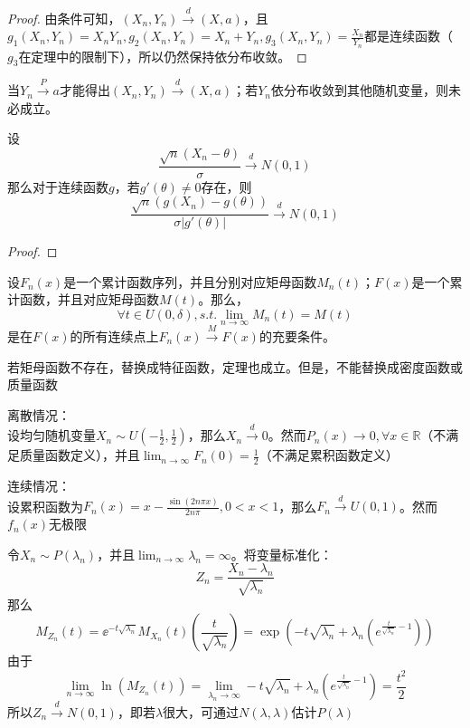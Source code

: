 \begin{proof}
    由条件可知，$(X_n,Y_n) \xrightarrow{d} (X,a)$，且$g_1(X_n,Y_n)=X_n Y_n, g_2(X_n,Y_n)=X_n+Y_n, g_3(X_n,Y_n)=\frac{X_n}{Y_n}$都是连续函数（$g_3$在定理中的限制下），所以仍然保持依分布收敛。
\end{proof}
\begin{remark}
    当$Y_n \xrightarrow{P} a$才能得出$(X_n,Y_n) \xrightarrow{d} (X,a)$；若$Y_n$依分布收敛到其他随机变量，则未必成立。
\end{remark}

\begin{theorem}[theta方法的极限定理]
    设
    \[ \frac{\sqrt{n}(X_n-\theta)}{\sigma} \xrightarrow{d} N(0,1) \]
    那么对于连续函数$g$，若$g'(\theta)\neq 0$存在，则
    \[ \frac{\sqrt{n}(g(X_n)-g(\theta))}{\sigma|g'(\theta)|} \xrightarrow{d} N(0,1) \]
\end{theorem}

\begin{proof}
\end{proof}

\begin{theorem}[连续性定理]\label{thm:continuity}
    设$F_n(x)$是一个累计函数序列，并且分别对应矩母函数$M_n(t)$；$F(x)$是一个累计函数，并且对应矩母函数$M(t)$。那么，
    \[ \forall t \in U(0,\delta) ,s.t. \lim_{n \to \infty}M_n(t) = M(t)\]
    是在$F(x)$的所有连续点上$F_n(x) \xrightarrow{M} F(x)$的充要条件。
\end{theorem}
\begin{remark}
    若矩母函数不存在，替换成特征函数，定理也成立。但是，不能替换成密度函数或质量函数
\end{remark}

\begin{example}
    离散情况：\\
    设均匀随机变量$X_n \sim U(-\frac{1}{2},\frac{1}{2})$，那么$X_n \xrightarrow{d} 0$。然而$P_n(x) \to 0, \forall x \in \mathbb{R}$（不满足质量函数定义），并且$\lim_{n \to \infty}F_n(0)=\frac{1}{2}$（不满足累积函数定义）

    连续情况：\\
    设累积函数为$F_n(x)=x-\frac{\sin (2n\pi x)}{2n\pi}, 0<x<1$，那么$F_n \xrightarrow{d} U(0,1)$。然而$f_n(x)$无极限
\end{example}

\begin{example}[泊松分布收敛于正态分布]
    令$X_n \sim P(\lambda_n)$，并且$\lim_{n \to \infty}\lambda_n =\infty$。将变量标准化：
    \[ Z_n=\frac{X_n-\lambda_n}{\sqrt{\lambda_n}} \]
    那么
    \[M_{Z_n}(t)=\ee^{-t\sqrt{\lambda_n}}M_{X_n}(t)(\frac{t}{\sqrt{\lambda_n}})=\exp (-t\sqrt{\lambda_n}+\lambda_n(e^{\frac{t}{\sqrt{\lambda_n}}-1}))\]
    由于
    \[ \lim_{n \to \infty}\ln (M_{Z_n}(t))=\lim_{\lambda_n \to \infty}-t\sqrt{\lambda_n}+\lambda_n(e^{\frac{t}{\sqrt{\lambda_n}}-1})=\frac{t^2}{2} \]
    所以$Z_n \xrightarrow{d} N(0,1)$，即若$\lambda$很大，可通过$N(\lambda,\lambda)$估计$P(\lambda)$
\end{example}

